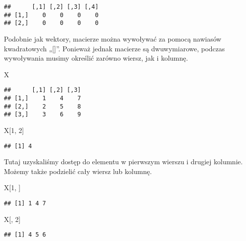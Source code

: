 \documentclass[
]{article}
\newenvironment{Shaded}{\begin{snugshade}}{\end{snugshade}}
\newcommand{\DecValTok}[1]{\textcolor[rgb]{0.00,0.00,0.81}{#1}}
\newcommand{\NormalTok}[1]{#1}
\begin{document}
\begin{verbatim}
##      [,1] [,2] [,3] [,4]
## [1,]    0    0    0    0
## [2,]    0    0    0    0
\end{verbatim}

Podobnie jak wektory, macierze można wywoływać za pomocą nawiasów
kwadratowych „{[}{]}''. Ponieważ jednak macierze są dwuwymiarowe,
podczas wywoływania musimy określić zarówno wiersz, jak i kolumnę.

\begin{Shaded}
\begin{Highlighting}[]
\NormalTok{X}
\end{Highlighting}
\end{Shaded}

\begin{verbatim}
##      [,1] [,2] [,3]
## [1,]    1    4    7
## [2,]    2    5    8
## [3,]    3    6    9
\end{verbatim}

\begin{Shaded}
\begin{Highlighting}[]
\NormalTok{X[}\DecValTok{1}\NormalTok{, }\DecValTok{2}\NormalTok{]}
\end{Highlighting}
\end{Shaded}

\begin{verbatim}
## [1] 4
\end{verbatim}

Tutaj uzyskaliśmy dostęp do elementu w pierwszym wierszu i drugiej
kolumnie. Możemy także podzielić cały wiersz lub kolumnę.

\begin{Shaded}
\begin{Highlighting}[]
\NormalTok{X[}\DecValTok{1}\NormalTok{, ]}
\end{Highlighting}
\end{Shaded}

\begin{verbatim}
## [1] 1 4 7
\end{verbatim}

\begin{Shaded}
\begin{Highlighting}[]
\NormalTok{X[, }\DecValTok{2}\NormalTok{]}
\end{Highlighting}
\end{Shaded}

\begin{verbatim}
## [1] 4 5 6
\end{verbatim}
\end{document}
